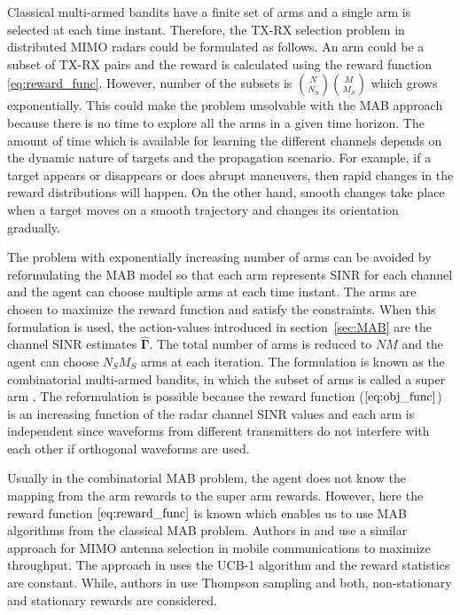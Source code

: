 \documentclass[english, 12pt, a4paper, elec, utf8, a-1b, online]{aaltothesis}
\newcommand{\vsinrb}{\widehat{\boldsymbol{\Gamma}}}
\begin{document}
Classical multi-armed bandits have a finite set of arms and a single arm is selected at each time instant.
Therefore, the TX-RX selection problem in distributed MIMO radars could be formulated as follows.
An arm could be a subset of TX-RX pairs and the reward is calculated using the reward function \eqref{eq:reward_func}.
However, number of the subsets is $\binom{N}{N_S}\binom{M}{M_S}$ which grows exponentially. This could make the problem unsolvable with the MAB approach because there is no time to explore all the arms in a given time horizon.
The amount of time which is available for learning the different channels depends on the dynamic nature of targets and the propagation scenario.
For example, if a target appears or disappears or does abrupt maneuvers, then rapid changes in the reward distributions will happen. 
On the other hand, smooth changes take place when a target moves on a smooth trajectory and changes its orientation gradually.

The problem with exponentially increasing number of arms can be avoided by reformulating the MAB model so that each arm represents SINR for each channel and the agent can choose multiple arms at each time instant.
The arms are chosen to maximize the reward function and satisfy the constraints.
When this formulation is used, the action-values introduced in section~\ref{sec:MAB} are the channel SINR estimates $\vsinrb$.
The total number of arms is reduced to $NM$ and the agent can choose $N_S M_S$ arms at each iteration.
The formulation is known as the combinatorial multi-armed bandits, in which the subset of arms is called a super arm \cite{Chen2014}.
The reformulation is possible because the reward function ($\ref{eq:obj_func}$) is an increasing function of the radar channel SINR values and each arm is independent since waveforms from different transmitters do not interfere with each other if orthogonal waveforms are used.

Usually in the combinatorial MAB problem, the agent does not know the mapping from the arm rewards to the super arm rewards.
However, here the reward function $\eqref{eq:reward_func}$ is known which enables us to use MAB algorithms from the classical MAB problem.
Authors in \cite{Mukherjee2012} and \cite{Kuai2019} use a similar approach for MIMO antenna selection in mobile communications to maximize throughput.
The approach in \cite{Mukherjee2012} uses the UCB-1 algorithm and the reward statistics are constant.
While, authors in \cite{Kuai2019} use Thompson sampling and both, non-stationary and stationary rewards are considered.
\end{document}
